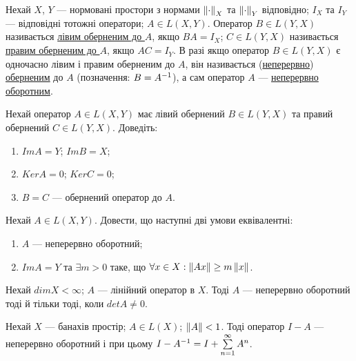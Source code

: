
\begin{theory}
    Нехай $X$, $Y$ --- нормовані простори з нормами $\left\lVert\cdot\right\rVert_X$ та 
    $\left\lVert\cdot\right\rVert_Y$ відповідно; $I_X$ та $I_Y$ --- відповідні тотожні 
    оператори; $A \in L(X, Y)$. Оператор $B \in L(Y, X)$ називається 
    \ul{лівим оберненим до $A$}, якщо $BA = I_X$; $C \in L(Y, X)$ 
    називається \ul{правим оберненим до $A$}, якщо $AC = I_Y$. В разі якщо оператор 
    $B \in L(Y, X)$ є одночасно лівим і правим оберненим до $A$, він називається 
    (\ul{неперервно}) \ul{оберненим} до $A$ (позначення: $B = A^{-1}$), 
    а сам оператор $A$ --- \ul{неперервно оборотним}.
\end{theory}

\begin{exercise}
    Нехай оператор $A \in L(X, Y)$ має лівий обернений $B \in L(Y, X)$ та правий обернений 
    $C \in L(Y, X)$. Доведіть: 
    \begin{enumerate}
        \item $Im A = Y$; $Im B = X$;
        \item $Ker A = {0}$; $Ker C = {0}$;
        \item $B = C$ --- обернений оператор до $A$.
    \end{enumerate}
\end{exercise}

\begin{exercise}
    Нехай $A \in L(X, Y)$. Довести, що наступні дві умови еквівалентні:
    \begin{enumerate}
        \item $A$ --- неперервно оборотний;
        \item $Im A = Y$ та $\exists m > 0$ таке, що $\forall x \in X:\left\lVert Ax\right\rVert \geq m \left\lVert x\right\rVert$. 
    \end{enumerate}
\end{exercise}

\begin{exercise}
    Нехай $dim X < \infty$; $A$ --- лінійний оператор в $X$. Тоді $A$ --- неперервно оборотний 
    тоді й тільки тоді, коли $det A \neq 0$.
\end{exercise}

\begin{exercise}
    Нехай $X$ --- банахів простір; $A \in L(X)$; $\left\lVert A\right\rVert < 1$. Тоді оператор $I-A$ --- 
    неперервно оборотний і при цьому $I-A^{-1} = I + \sum\limits_{n=1}^\infty A^n$.
\end{exercise}

